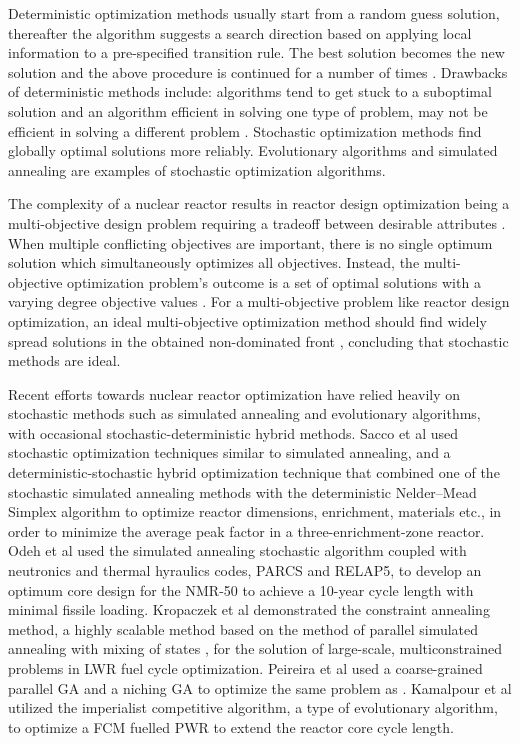 Deterministic optimization methods usually start from a random guess solution, 
thereafter the algorithm suggests a search direction based on applying local 
information to a pre-specified transition rule. 
The best solution becomes the new solution and the above procedure is continued 
for a number of times \cite{deb_multi-objective_2001}. 
Drawbacks of deterministic methods include: algorithms tend to get stuck to a 
suboptimal solution and an algorithm efficient in solving one type of problem, 
may not be efficient in solving a different problem \cite{deb_multi-objective_2001}. 
Stochastic optimization methods find globally optimal solutions more reliably. 
Evolutionary algorithms and simulated annealing are examples of stochastic 
optimization algorithms. 

The complexity of a nuclear reactor results in reactor design optimization 
being a multi-objective design problem requiring a tradeoff between desirable 
attributes \cite{byrne_evolving_2014,simon_sciences_2019}. 
When multiple conflicting objectives are important, there is no single optimum 
solution which simultaneously optimizes all objectives. 
Instead, the multi-objective optimization problem's outcome is a set of optimal 
solutions with a varying degree objective values \cite{deb_multi-objective_2001}. 
For a multi-objective problem like reactor design optimization, 
an ideal multi-objective optimization method should find widely spread solutions 
in the obtained non-dominated front \cite{deb_multi-objective_2001}, concluding 
that stochastic methods are ideal. 

Recent efforts towards nuclear reactor optimization have relied heavily on 
stochastic methods such as simulated annealing and evolutionary algorithms, 
with occasional stochastic-deterministic hybrid methods. 
Sacco et al \cite{sacco_two_2006,sacco_metropolis_2008} used stochastic 
optimization techniques similar to simulated annealing, and a 
deterministic-stochastic hybrid optimization technique
that combined one of the stochastic simulated annealing methods with the 
deterministic Nelder–Mead Simplex algorithm to optimize reactor dimensions, 
enrichment, materials etc., in order to minimize the average peak factor in a 
three-enrichment-zone reactor. 
Odeh et al \cite{odeh_core_2016} used the simulated annealing stochastic algorithm 
coupled with neutronics and thermal hyraulics codes, \gls{PARCS} and RELAP5, 
to develop an optimum core design for the \gls{NMR-50} to achieve a 10-year cycle length 
with minimal fissile loading. 
Kropaczek et al \cite{kropaczek_large-scale_2019} demonstrated the constraint 
annealing method, a highly scalable method based on the method of parallel 
simulated annealing with mixing of states \cite{kropaczek_constraint_2019}, for 
the solution of large-scale, multiconstrained problems in \gls{LWR} fuel cycle 
optimization. 
Peireira et al \cite{pereira_coarse-grained_2003,pereira_parallel_2008} 
used a coarse-grained parallel \gls{GA} and a niching \gls{GA}
to optimize the same problem as \cite{sacco_two_2006}. 
Kamalpour et al \cite{kamalpour_smart_2020} utilized the imperialist competitive 
algorithm, a type of evolutionary algorithm, to optimize a \gls{FCM} fuelled 
\gls{PWR} to extend the reactor core cycle length. 

